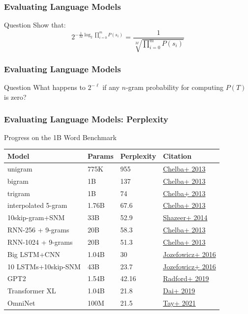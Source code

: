 \begin{frame}
\frametitle{Evaluating Language Models}
\begin{alertblock}{Question}
Show that:
\[ 2^{- \frac{1}{M} \log_2 \prod_{i=0}^m P(s_i)} = \frac{1}{\sqrt[M]{\prod_{i=0}^m P(s_i)}} \]
\end{alertblock}
\end{frame}

\begin{frame}
\frametitle{Evaluating Language Models}
\begin{alertblock}{Question}
What happens to $2^{- \ell}$ if any $n$-gram probability for computing $P(T)$ is zero?
\end{alertblock}
\end{frame}

\begin{frame}
\frametitle{Evaluating Language Models: Perplexity}
\begin{block}{Progress on the 1B Word Benchmark}
\centering
\begin{tabular}{llll}
Model & Params & Perplexity & Citation \\
\hline
unigram & 775K & 955 & \href{https://arxiv.org/abs/1312.3005}{Chelba+ 2013} \\
bigram & 1B & 137 & \href{https://arxiv.org/abs/1312.3005}{Chelba+ 2013} \\
trigram & 1B & 74 & \href{https://arxiv.org/abs/1312.3005}{Chelba+ 2013} \\
interpolated 5-gram & 1.76B & 67.6 & \href{https://arxiv.org/abs/1312.3005}{Chelba+ 2013} \\
10skip-gram+SNM & 33B & 52.9 & \href{https://arxiv.org/abs/1412.1454}{Shazeer+ 2014} \\
\hline
RNN-256 + 9-grams & 20B & 58.3 & \href{https://arxiv.org/abs/1312.3005}{Chelba+ 2013} \\
RNN-1024 + 9-grams & 20B & 51.3 & \href{https://arxiv.org/abs/1312.3005}{Chelba+ 2013} \\
Big LSTM+CNN & 1.04B & 30 & \href{https://arxiv.org/abs/1602.02410}{Jozefowicz+ 2016} \\
10 LSTMs+10skip-SNM & 43B & 23.7 & \href{https://arxiv.org/abs/1602.02410}{Jozefowicz+ 2016}\\
\hline
GPT2 & 1.54B & 42.16 & \href{https://openai.com/research/better-language-models}{Radford+ 2019} \\
Transformer XL & 1.04B & 21.8 & \href{https://aclanthology.org/P19-1285/}{Dai+ 2019}\\
OmniNet & 100M & 21.5 & \href{https://arxiv.org/abs/2103.01075}{Tay+ 2021} \\
\hline
\end{tabular}
\end{block}
\end{frame}

